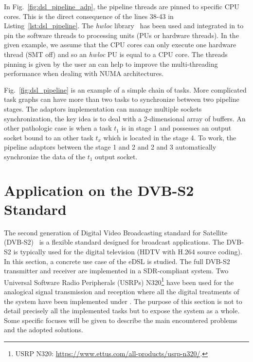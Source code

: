 In Fig.~\ref{fig:dsl_pipeline_adp}, the pipeline threads are pinned to specific
CPU cores. This is the direct consequence of the lines 38-43 in
Listing~\ref{lst:dsl_pipeline}. The \emph{hwloc} library~\cite{Broquedis2010}
has been used and integrated in \AFFECT to pin the software threads to
processing units (PUs or hardware threads). In the given example, we assume that
the CPU cores can only execute one hardware thread (SMT off) and so an
\emph{hwloc} PU is equal to a CPU core. The threads pinning is given by the user
an can help to improve the multi-threading performance when dealing with NUMA
architectures.


Fig.~\ref{fig:dsl_pipeline} is an example of a simple chain of tasks. More
complicated task graphs can have more than two tasks to synchronize between two
pipeline stages. The adaptors implementation can manage multiple sockets
synchronization, the key idea is to deal with a 2-dimensional array of buffers.
An other pathologic case is when a task $t_1$ is in stage 1 and possesses an
output socket bound to an other task $t_{x}$ which is located in the stage 4.
To work, the pipeline adaptors between the stage 1 and 2 and 2 and 3
automatically synchronize the data of the $t_1$ output socket.

\section{Application on the DVB-S2 Standard}

The second generation of Digital Video Broadcasting standard for Satellite
(DVB-S2)~\cite{ETSI2005} is a flexible standard designed for broadcast
applications. The DVB-S2 is typically used for the digital television (HDTV
with H.264 source coding). In this section, a concrete use case of the \AFFECT
eDSL is studied. The full DVB-S2 transmitter and receiver are implemented in a
SDR-compliant system. Two Universal Software Radio Peripherals (USRPs)
N320\footnote{USRP N320: \url{https://www.ettus.com/all-products/usrp-n320/}.}
have been used for the analogical signal transmission and reception where all
the digital treatments of the system have been implemented under \AFFECT. The
purpose of this section is not to detail precisely all the implemented tasks
but to expose the system as a whole. Some specific focuses will be given to
describe the main encountered problems and the adopted solutions.

